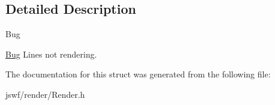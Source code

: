 \subsection{Detailed Description}
\begin{DoxyRefDesc}{Bug}
\item[\hyperlink{bug__bug000001}{Bug}]Lines not rendering. \end{DoxyRefDesc}


The documentation for this struct was generated from the following file\+:\begin{DoxyCompactItemize}
\item 
jswf/render/Render.\+h\end{DoxyCompactItemize}
